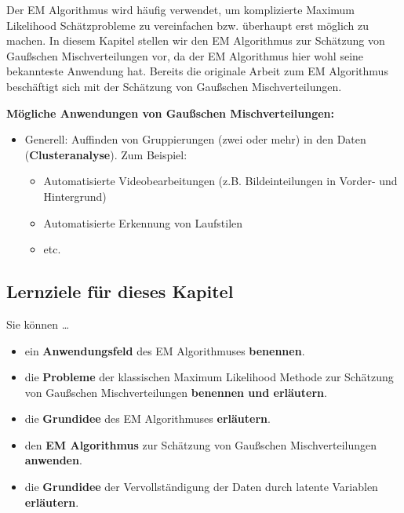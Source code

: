 \documentclass[
  ngerman,
]{book}
\providecommand{\tightlist}{%
  \setlength{\itemsep}{0pt}\setlength{\parskip}{0pt}}
\begin{document}
Der EM Algorithmus wird häufig verwendet, um komplizierte Maximum Likelihood Schätzprobleme zu vereinfachen bzw. überhaupt erst möglich zu machen. In diesem Kapitel stellen wir den EM Algorithmus zur Schätzung von Gaußschen Mischverteilungen vor, da der EM Algorithmus hier wohl seine bekannteste Anwendung hat. Bereits die originale Arbeit zum EM Algorithmus \citep{Dempster_1977} beschäftigt sich mit der Schätzung von Gaußschen Mischverteilungen.

\textbf{Mögliche Anwendungen von Gaußschen Mischverteilungen:}

\begin{itemize}
\item
  Generell: Auffinden von Gruppierungen (zwei oder mehr) in den Daten (\textbf{Clusteranalyse}). Zum Beispiel:

  \begin{itemize}
  \tightlist
  \item
    Automatisierte Videobearbeitungen (z.B. Bildeinteilungen in Vorder- und Hintergrund)
  \item
    Automatisierte Erkennung von Laufstilen
  \item
    etc.
  \end{itemize}
\end{itemize}

\hypertarget{lernziele-fuxfcr-dieses-kapitel}{%
\subsection*{Lernziele für dieses Kapitel}\label{lernziele-fuxfcr-dieses-kapitel}}

Sie können \ldots{}

\begin{itemize}
\tightlist
\item
  ein \textbf{Anwendungsfeld} des EM Algorithmuses \textbf{benennen}.
\item
  die \textbf{Probleme} der klassischen Maximum Likelihood Methode zur Schätzung von Gaußschen Mischverteilungen \textbf{benennen und erläutern}.
\item
  die \textbf{Grundidee} des EM Algorithmuses \textbf{erläutern}.
\item
  den \textbf{EM Algorithmus} zur Schätzung von Gaußschen Mischverteilungen \textbf{anwenden}.
\item
  die \textbf{Grundidee} der Vervollständigung der Daten durch latente Variablen \textbf{erläutern}.
\end{itemize}
\end{document}
